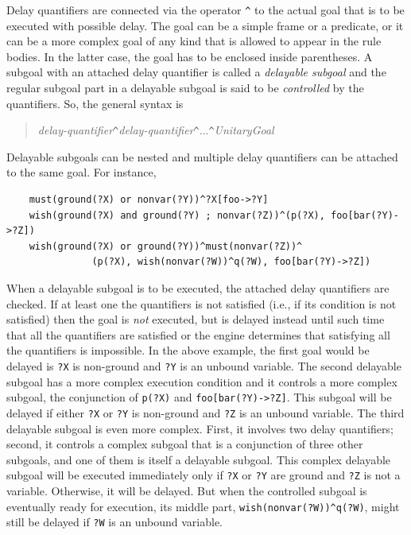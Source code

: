 \documentclass[11pt]{article}
\begin{document}
Delay quantifiers are connected via the operator \texttt{\^} to the actual
goal that is to be executed with possible delay. The goal can be a simple
frame or a predicate, or it can be a more complex goal of any kind that
is allowed to appear in the rule bodies. In the latter case, the goal has
to be enclosed inside parentheses. A subgoal with an attached delay
quantifier is called a \emph{delayable subgoal}
and the regular subgoal part in a delayable subgoal is said to be
\emph{controlled} by the quantifiers.  So, the general syntax is
\begin{quote}
   \emph{delay-quantifier}\texttt{\^}\emph{delay-quantifier}\texttt{\^}...\texttt{\^}\emph{UnitaryGoal}  
\end{quote}
Delayable subgoals can be
nested and multiple delay quantifiers can be attached to the same goal.
For instance, 
\begin{verbatim}
    must(ground(?X) or nonvar(?Y))^?X[foo->?Y]
    wish(ground(?X) and ground(?Y) ; nonvar(?Z))^(p(?X), foo[bar(?Y)->?Z])
    wish(ground(?X) or ground(?Y))^must(nonvar(?Z))^
               (p(?X), wish(nonvar(?W))^q(?W), foo[bar(?Y)->?Z])
\end{verbatim}
When a delayable subgoal is to be executed, the attached delay quantifiers
are checked. If at least one the quantifiers is not satisfied (i.e., if its
condition is not satisfied) then the goal is \emph{not} executed, but is
delayed instead until such time that all the quantifiers are satisfied or
the engine determines that satisfying all the quantifiers is impossible.
In the above example, the first goal would be delayed is \texttt{?X} is
non-ground and \texttt{?Y} is an unbound variable. The second delayable
subgoal has a more complex execution condition and it controls a more
complex subgoal, the conjunction of \texttt{p(?X)} and
\texttt{foo[bar(?Y)->?Z]}.  This subgoal will be delayed if either
\texttt{?X} or \texttt{?Y} is non-ground and \texttt{?Z} is an unbound
variable. The third delayable subgoal is even more complex. First, it
involves two delay quantifiers; second, it controls a complex subgoal that
is a conjunction of three other subgoals, and one of them is itself a
delayable subgoal.  This complex delayable subgoal will be executed
immediately only if \texttt{?X} or \texttt{?Y} are ground and \texttt{?Z}
is not a variable.  Otherwise, it will be delayed. But when the controlled
subgoal is eventually ready for execution, its middle part,
\texttt{wish(nonvar(?W))\^{}q(?W)}, might still be delayed if \texttt{?W}
is an unbound variable.
\end{document}
